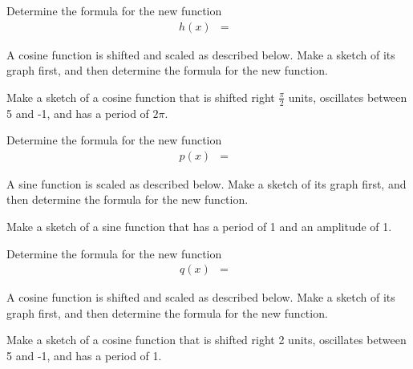 \begin{problem}
\begin{subproblem}
    \vspace{-0.5em}
    \hspace{-7em}\scalebox{0.72}{}

    \item Determine the formula for the new function
      \begin{eqnarray*}
        h(x) & = & 
      \end{eqnarray*}
  \end{subproblem}

\item A cosine function is shifted and scaled as described
  below. Make a sketch of its graph first, and then determine the
  formula for the new function.
  \begin{subproblem}
  \item Make a sketch of a cosine function that is shifted right
    $\frac{\pi}{2}$ units, oscillates between 5 and -1, and has a
    period of $2\pi$.

    \vspace{-0.5em}
    \hspace{-7em}\scalebox{0.72}{}

    \item Determine the formula for the new function
      \begin{eqnarray*}
        p(x) & = & 
      \end{eqnarray*}
  \end{subproblem}

\clearpage

\item A sine function is scaled as described below. Make a sketch of
  its graph first, and then determine the formula for the new
  function.
  \begin{subproblem}
  \item Make a sketch of a sine function that has a period of 1 and an
    amplitude of 1.

    \vspace{-0.5em}
    \hspace{-7em}\scalebox{0.72}{}

  \item Determine the formula for the new function
    \begin{eqnarray*}
        q(x) & = & 
    \end{eqnarray*}
  \end{subproblem}

\item A cosine function is shifted and scaled as described
  below. Make a sketch of its graph first, and then determine the
  formula for the new function.
  \begin{subproblem}
  \item Make a sketch of a cosine function that is shifted right
    2 units, oscillates between 5 and -1, and has a period of 1.


\end{subproblem}
\end{problem}
